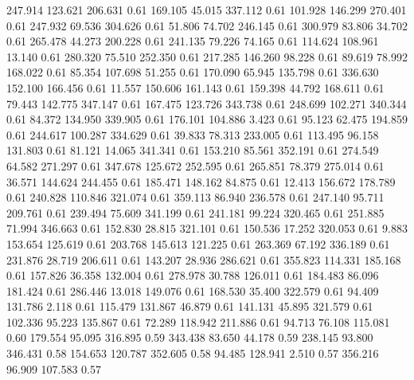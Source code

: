  247.914  123.621  206.631         0.61
 169.105   45.015  337.112         0.61
 101.928  146.299  270.401         0.61
 247.932   69.536  304.626         0.61
  51.806   74.702  246.145         0.61
 300.979   83.806   34.702         0.61
 265.478   44.273  200.228         0.61
 241.135   79.226   74.165         0.61
 114.624  108.961   13.140         0.61
 280.320   75.510  252.350         0.61
 217.285  146.260   98.228         0.61
  89.619   78.992  168.022         0.61
  85.354  107.698   51.255         0.61
 170.090   65.945  135.798         0.61
 336.630  152.100  166.456         0.61
  11.557  150.606  161.143         0.61
 159.398   44.792  168.611         0.61
  79.443  142.775  347.147         0.61
 167.475  123.726  343.738         0.61
 248.699  102.271  340.344         0.61
  84.372  134.950  339.905         0.61
 176.101  104.886    3.423         0.61
  95.123   62.475  194.859         0.61
 244.617  100.287  334.629         0.61
  39.833   78.313  233.005         0.61
 113.495   96.158  131.803         0.61
  81.121   14.065  341.341         0.61
 153.210   85.561  352.191         0.61
 274.549   64.582  271.297         0.61
 347.678  125.672  252.595         0.61
 265.851   78.379  275.014         0.61
  36.571  144.624  244.455         0.61
 185.471  148.162   84.875         0.61
  12.413  156.672  178.789         0.61
 240.828  110.846  321.074         0.61
 359.113   86.940  236.578         0.61
 247.140   95.711  209.761         0.61
 239.494   75.609  341.199         0.61
 241.181   99.224  320.465         0.61
 251.885   71.994  346.663         0.61
 152.830   28.815  321.101         0.61
 150.536   17.252  320.053         0.61
   9.883  153.654  125.619         0.61
 203.768  145.613  121.225         0.61
 263.369   67.192  336.189         0.61
 231.876   28.719  206.611         0.61
 143.207   28.936  286.621         0.61
 355.823  114.331  185.168         0.61
 157.826   36.358  132.004         0.61
 278.978   30.788  126.011         0.61
 184.483   86.096  181.424         0.61
 286.446   13.018  149.076         0.61
 168.530   35.400  322.579         0.61
  94.409  131.786    2.118         0.61
 115.479  131.867   46.879         0.61
 141.131   45.895  321.579         0.61
 102.336   95.223  135.867         0.61
  72.289  118.942  211.886         0.61
  94.713   76.108  115.081         0.60
 179.554   95.095  316.895         0.59
 343.438   83.650   44.178         0.59
 238.145   93.800  346.431         0.58
 154.653  120.787  352.605         0.58
  94.485  128.941    2.510         0.57
 356.216   96.909  107.583         0.57
